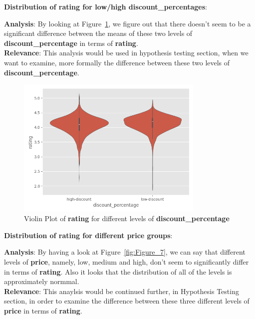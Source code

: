 \documentclass[a4paper,12pt]{article}
\begin{document}
\noindent\textbf{Distribution of rating for low/high discount\_percentages}:

\noindent\textbf{Analysis}: By looking at Figure~\ref{fig:Figure_6}, we figure out that there doesn't seem to be a significant difference between the means of these two levels of \textbf{discount\_percentage} in terms of \textbf{rating}. \\ 

\noindent\textbf{Relevance}: This analysis would be used in hypothesis testing section, when we want to examine, more formally the difference between these two levels of \textbf{discount\_percentage}. \\

\begin{figure}[H]
    \centering
    \includegraphics[width=0.8\textwidth]{./images/violin_of_rating_for_different_discount_percentages.png} %
    \caption{Violin Plot of \textbf{rating} for different levels of \textbf{discount\_percentage}}
    \label{fig:Figure_6}
\end{figure}

\noindent\textbf{Distribution of rating for different price groups}:

\noindent\textbf{Analysis}: By having a look at Figure~\ref{fig:Figure_7}, we can say that different levels of \textbf{price}, namely, low, medium and high, don't seem to significantly differ in terms of \textbf{rating}. Also it looks that the distribution of all of the levels is approximately normmal. \\ 

\noindent\textbf{Relevance}: This anaylsis would be continued further, in Hypothesis Testing section, in order to examine the difference between these  three different levels of \textbf{price} in terms of \textbf{rating}. \\
\end{document}
